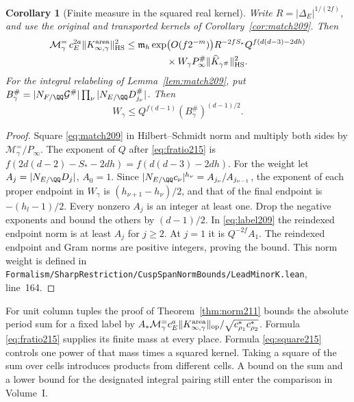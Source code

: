 \documentclass[a4paper,11pt]{article}
\newtheorem{corollary}[proposition]{Corollary}
\theoremstyle{definition}
\theoremstyle{remark}
\newcommand{\srcloc}[2]{{\small\nolinkurl{#1.lean}}, line~#2}
\numberwithin{equation}{section}
\begin{document}
\begin{corollary}[Finite measure in the squared real kernel]\label{cor:square215}
Write \(R=|\Delta_E|^{1/(2f)}\), and use the original and
transported kernels of Corollary~\ref{cor:match209}. Then
\begin{align}
 \mathcal M_\gamma^{=}\,c_E^{2a}\|K_{\infty,\gamma}^{\rm area}\|_{\rm HS}^2
 &\le \mathfrak m_h\exp\bigl(O(f2^{-m})\bigr) R^{-2fS_*}
              Q^{f(d(d-3)-2dh)} \notag\\
 &\hspace{15mm}{}\times W_\gamma P_\infty^\#
                           \|\widehat K_{\gamma^\#}\|_{\rm HS}^2 .
 \label{eq:square215}
\end{align}
For the integral relabeling of Lemma~\ref{lem:match209}, put
\(B_\gamma^\#=|N_{F/\QQ}\mathcal G^\#|
 \prod_{\nu}|N_{E/\QQ}D^\#_{j_\nu}|\). Then
\[
               W_\gamma\le Q^{f(d-1)}
                                  (B_\gamma^\#)^{(d-1)/2}.
\]
\end{corollary}
\begin{proof}
Square \eqref{eq:match209} in Hilbert--Schmidt norm and multiply
both sides by \(\mathcal M_\gamma^{=}/P_\infty\).
The exponent of \(Q\) after \eqref{eq:fratio215} is
\(f(2d(d-2)-S_*-2dh)=f(d(d-3)-2dh)\).
For the weight let \(A_j=|N_{E/\QQ}D_j|\), \(A_0=1\).
Since \(|N_{E/\QQ}c_\nu|^{h_\nu}=A_{j_\nu}/A_{j_{\nu-1}}\),
the exponent of each proper endpoint in \(W_\gamma\) is
\((h_{\nu+1}-h_\nu)/2\), and that of the final endpoint is
\(-(h_l-1)/2\). Every nonzero \(A_j\) is an integer at least one.
Drop the negative exponents and bound the others by \((d-1)/2\).
In \eqref{eq:label209} the reindexed endpoint norm is at least
\(A_j\) for \(j\ge2\). At \(j=1\) it is \(Q^{-2f}A_1\).
The reindexed endpoint and Gram norms are positive integers,
proving the bound. This norm weight is defined in
\srcloc{Formalism/SharpRestriction/CuspSpanNormBounds/LeadMinorK}{164}.
\end{proof}

For unit column tuples the proof of Theorem~\ref{thm:norm211}
bounds the absolute period sum for a fixed label by
\(A_*\mathcal M_\gamma^{=}c_E^a\|K_{\infty,\gamma}^{\rm area}\|_{\rm op}
/\sqrt{c_{\rho_1}^*c_{\rho_2}^*}\).
Formula \eqref{eq:fratio215} supplies its finite mass at every
place. Formula \eqref{eq:square215} controls one power of that
mass times a squared kernel. Taking a square of the sum over
cells introduces products from different cells. A bound on the
sum and a lower bound for the designated integral pairing still
enter the comparison in Volume~I.
\end{document}
